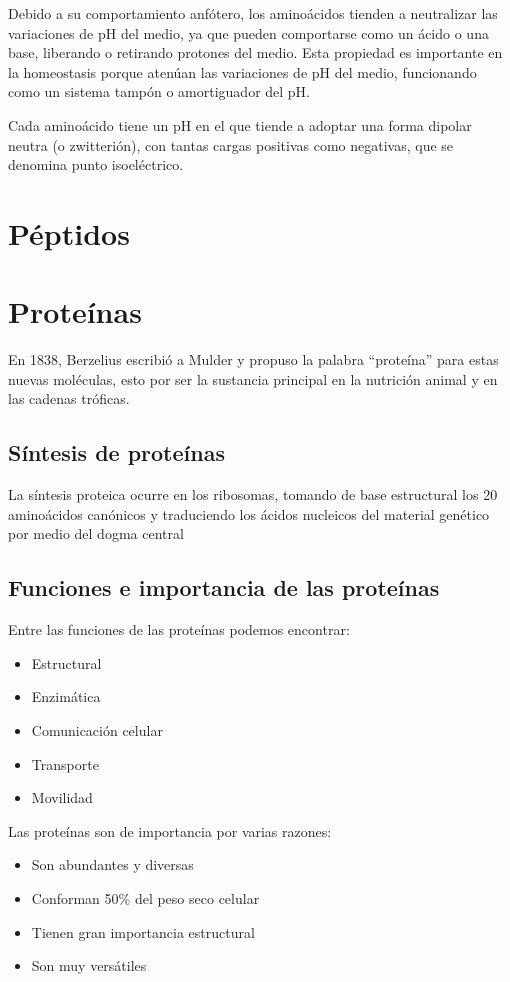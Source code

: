 Debido a su comportamiento anfótero, los aminoácidos tienden a neutralizar las variaciones de pH del medio, ya que pueden comportarse como un ácido o una base, liberando o retirando protones del medio. Esta propiedad es importante en la homeostasis porque atenúan las variaciones de pH del medio, funcionando como un sistema tampón o amortiguador del pH.

Cada aminoácido tiene un pH en el que tiende a adoptar una forma dipolar neutra (o zwitterión), con tantas cargas positivas como negativas, que se denomina punto isoeléctrico.

\section{Péptidos}



\section{Proteínas}

En 1838, Berzelius escribió a Mulder y propuso la palabra ``proteína'' para estas nuevas moléculas, esto por ser la sustancia principal en la nutrición animal y en las cadenas tróficas.

\subsection{Síntesis de proteínas}

La síntesis proteica ocurre en los ribosomas, tomando de base estructural los 20 aminoácidos canónicos y traduciendo los ácidos nucleicos del material genético por medio del dogma central

\subsection{Funciones e importancia de las proteínas}

Entre las funciones de las proteínas podemos encontrar:

\begin{itemize}
    \item Estructural
    \item Enzimática
    \item Comunicación celular
    \item Transporte
    \item Movilidad
\end{itemize}

Las proteínas son de importancia por varias razones:

\begin{itemize}
    \item Son abundantes y diversas
    \item Conforman 50\% del peso seco celular
    \item Tienen gran importancia estructural
    \item Son muy versátiles
\end{itemize}
